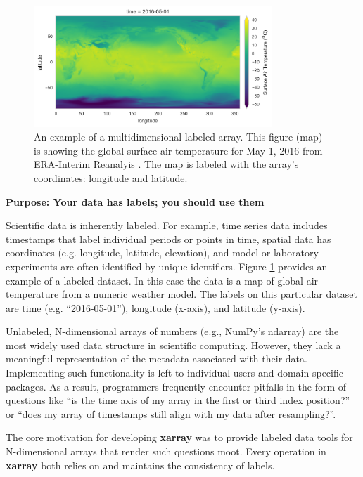 \documentclass{jors}
\begin{document}
\begin{figure}[h]
	\centering
	\includegraphics[width=0.8\textwidth]{ERA-Interim_surface_air_temp_figure}
	\caption{An example of a multidimensional labeled array. This figure (map) is showing the global surface air temperature for May 1, 2016 from ERA-Interim Reanalyis \citep{Dee_2011}. The map is labeled with the array's coordinates: longitude and latitude.}
	\label{fig:temperature_map}
\end{figure}

\textbf{Purpose: Your data has labels; you should use them}

Scientific data is inherently labeled.
For example, time series data includes time\-stamps that label individual periods or points in time, spatial data has coordinates (e.g. longitude, latitude, elevation), and model or laboratory experiments are often identified by unique identifiers.
Figure \ref{fig:temperature_map} provides an example of a labeled dataset.
In this case the data is a map of global air temperature from a numeric weather model.
The labels on this particular dataset are time (e.g. ``2016-05-01''), longitude (x-axis), and latitude (y-axis).

Unlabeled, N-dimensional arrays of numbers (e.g., NumPy's ndarray) are the most widely used data structure in scientific computing.
However, they lack a meaningful representation of the metadata associated with their data.
Implementing such functionality is left to individual users and domain-specific packages.
As a result, programmers frequently encounter pitfalls in the form of questions like ``is the time axis of my array in the first or third index position?'' or ``does my array of timestamps still align with my data after resampling?''.

The core motivation for developing \textbf{xarray} was to provide labeled data tools for N-dimensional arrays that render such questions moot. Every operation in \textbf{xarray} both relies on and maintains the consistency of labels.
\end{document}

